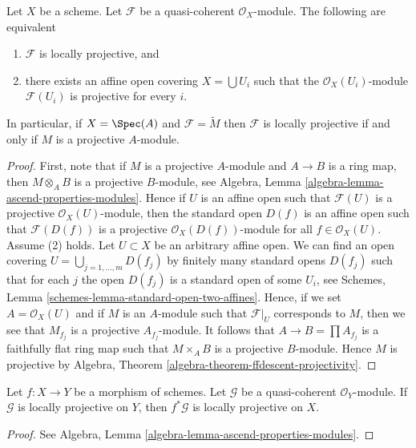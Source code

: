 \begin{lemma}
\label{lemma-locally-projective}
Let $X$ be a scheme.
Let $\mathcal{F}$ be a quasi-coherent $\mathcal{O}_X$-module.
The following are equivalent
\begin{enumerate}
\item $\mathcal{F}$ is locally projective, and
\item there exists an affine open covering $X = \bigcup U_i$
such that the $\mathcal{O}_X(U_i)$-module
$\mathcal{F}(U_i)$ is projective for every $i$.
\end{enumerate}
In particular, if $X = \Spec(A)$ and $\mathcal{F} = \widetilde{M}$
then $\mathcal{F}$ is locally projective if and only if $M$ is a projective
$A$-module.
\end{lemma}

\begin{proof}
First, note that if $M$ is a projective $A$-module and $A \to B$ is a
ring map, then $M \otimes_A B$ is a projective $B$-module, see
Algebra, Lemma \ref{algebra-lemma-ascend-properties-modules}.
Hence if $U$ is an affine open such that $\mathcal{F}(U)$ is a projective
$\mathcal{O}_X(U)$-module, then the standard open $D(f)$ is an
affine open such that $\mathcal{F}(D(f))$ is a projective
$\mathcal{O}_X(D(f))$-module for all $f \in \mathcal{O}_X(U)$.
Assume (2) holds. Let $U \subset X$ be an arbitrary affine open.
We can find an open covering $U = \bigcup_{j = 1, \ldots, m} D(f_j)$
by finitely many standard opens $D(f_j)$ such that for each
$j$ the open $D(f_j)$ is a standard open of some $U_i$, see
Schemes, Lemma \ref{schemes-lemma-standard-open-two-affines}.
Hence, if we set $A = \mathcal{O}_X(U)$ and if $M$ is an $A$-module
such that $\mathcal{F}|_U$ corresponds to $M$, then we see that
$M_{f_j}$ is a projective $A_{f_j}$-module. It follows that
$A \to B = \prod A_{f_j}$ is a faithfully flat ring map
such that $M \times_A B$ is a projective $B$-module.
Hence $M$ is projective by
Algebra, Theorem \ref{algebra-theorem-ffdescent-projectivity}.
\end{proof}

\begin{lemma}
\label{lemma-locally-projective-pullback}
Let $f : X \to Y$ be a morphism of schemes.
Let $\mathcal{G}$ be a quasi-coherent $\mathcal{O}_Y$-module.
If $\mathcal{G}$ is locally projective on $Y$, then $f^*\mathcal{G}$
is locally projective on $X$.
\end{lemma}

\begin{proof}
See
Algebra, Lemma \ref{algebra-lemma-ascend-properties-modules}.
\end{proof}






